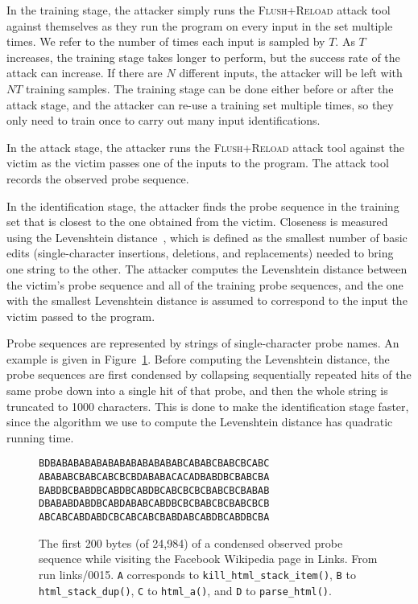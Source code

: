 \documentclass[letterpaper,twocolumn,10pt]{article}
\begin{document}
In the training stage, the attacker simply runs the \textsc{Flush+Reload} attack
tool against themselves as they run the program on every input in the set
multiple times. We refer to the number of times each input is sampled by $T$. As
$T$ increases, the training stage takes longer to perform, but the success rate
of the attack can increase. If there are $N$ different inputs, the attacker will
be left with $NT$ training samples. The training stage can be done either before
or after the attack stage, and the attacker can re-use a training set multiple
times, so they only need to train once to carry out many input identifications.

In the attack stage, the attacker runs the \textsc{Flush+Reload} attack tool
against the victim as the victim passes one of the inputs to the program. The
attack tool records the observed probe sequence.

In the identification stage, the attacker finds the probe sequence in the
training set that is closest to the one obtained from the victim. Closeness is
measured using the Levenshtein distance~\cite{levenshtein1966binary}, which is
defined as the smallest number of basic edits (single-character insertions,
deletions, and replacements) needed to bring one string to the other. The
attacker computes the Levenshtein distance between the victim's probe sequence
and all of the training probe sequences, and the one with the smallest
Levenshtein distance is assumed to correspond to the input the victim passed to
the program.

Probe sequences are represented by strings of single-character probe names. An
example is given in Figure~\ref{figure:probetext}. Before computing the
Levenshtein distance, the probe sequences are first condensed by collapsing
sequentially repeated hits of the same probe down into a single hit of that
probe, and then the whole string is truncated to 1000 characters. This is done
to make the identification stage faster, since the algorithm we use to compute
the Levenshtein distance has quadratic running time.

\begin{figure}
    \centering
\begin{verbatim}
BDBABABABABABABABABABABABCABABCBABCBCABC
ABABABCBABCABCBCBDABABACACADBABDBCBABCBA
BABDBCBABDBCABDBCABDBCABCBCBCBABCBCBABAB
DBABABDABDBCABDABABCABDBCBCBABCBCBABCBCB
ABCABCABDABDCBCABCABCBABDABCABDBCABDBCBA
\end{verbatim}
\caption{The first 200 bytes (of 24,984) of a condensed observed probe sequence
    while visiting the Facebook Wikipedia page in Links. From run links/0015.
    \texttt{A} corresponds to \texttt{kill\_html\_stack\_item()}, \texttt{B} to
    \texttt{html\_stack\_dup()}, \texttt{C} to \texttt{html\_a()}, and
\texttt{D} to \texttt{parse\_html()}.} \label{figure:probetext}
\end{figure}
\end{document}
